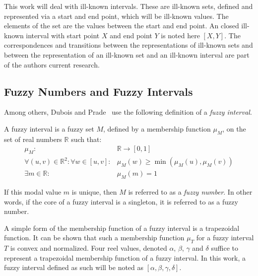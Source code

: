 This work will deal with ill-known intervals. These are ill-known sets, defined and represented via a start and end point, which will be ill-known values. The elements of the set are the values between the start and end point. An closed ill-known interval with start point $X$ and end point $Y$ is noted here $\left[X, Y\right]$. The correspondences and transitions between the representations of ill-known sets and between the representation of an ill-known set and an ill-known interval are part of the authors current research.

\subsection{\label{subsec:fuzzy-numbers}Fuzzy Numbers and Fuzzy Intervals}
Among others, Dubois and Prade~\cite{Dubois1983} use the following definition of a \emph{fuzzy interval}.
\begin{definition}
A fuzzy interval is a fuzzy set $M$, defined by a membership function $\mu_{M}$, on the set of real numbers $\mathbb{R}$ such that:
\begin{eqnarray}
\mu_{M} : & \!\!\!\!\!\!\!\!\!\!\!\!\!\!\!\!\!\!\!\!\!\!\!\!\!\!\!\!\!\!\!\!\!\!\!\!\!\!\!\!\!\!\!\!\!\!\!\!\!\! \mathbb{R} \rightarrow \left[0,1\right] \nonumber \\ 
\forall (u,v)\in\mathbb{R}^2: \forall w \in [u,v]:&\mu_M(w) \geq\min(\mu_M(u),\mu_M(v))  \\
\exists m \in \mathbb{R} : & \!\!\!\!\!\!\!\!\!\!\!\!\!\!\!\!\!\!\!\!\!\!\!\!\!\!\!\!\!\!\!\!\!\!\!\!\!\!\!\!\!\!\!\!\!\!\!\! \mu_M(m)=1 
\end{eqnarray}
\end{definition}
If this modal value $m$ is unique, then $M$ is referred to as a \emph{fuzzy number}. In other words, if the core of a fuzzy interval is a singleton, it is referred to as a fuzzy number.

A simple form of the membership function of a fuzzy interval is a trapezoidal function. It can be shown that such a membership function $\mu_T$ for a fuzzy interval $T$ is convex and normalized. Four reel values, denoted $\alpha$, $\beta$, $\gamma$ and $\delta$ suffice to represent a trapezoidal membership function of a fuzzy interval. In this work, a fuzzy interval defined as such will be noted as $\left[\alpha, \beta, \gamma, \delta\right]$. %


